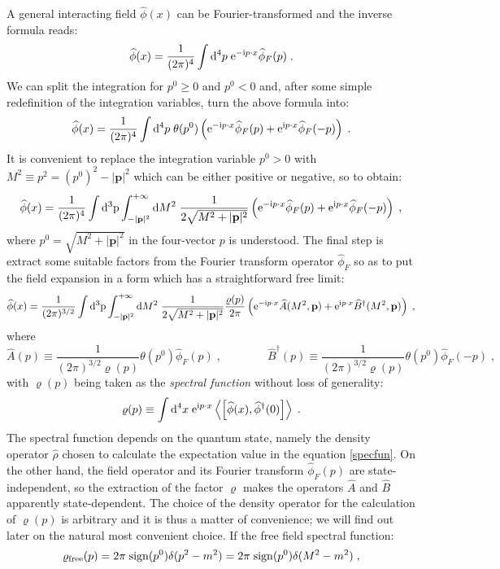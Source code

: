 \documentclass[prd,superscriptaddress,nofootinbib,notitlepage]{revtex4-1}
\def\wA{{\widehat A}}
\def\wrho{{\widehat{\rho}}}
\def\wA{\widehat A}
\def\wBd{\widehat B^{\dagger}}
\def\wphi{\widehat \phi}
\newcommand{\e}{{\rm e}}
\newcommand{\pp}{{\rm p}}
\newcommand{\di}{{\rm d}}
\newcommand{\ii}{{\rm i}}
\newcommand{\p}{{\mathbf{p}}}
\newcommand{\be}{\begin{equation}}
\newcommand{\ee}{\end{equation}}
\begin{document}
A general interacting field $\wphi(x)$ can be Fourier-transformed and the inverse formula reads:
%
$$
 \wphi(x) = \frac{1}{(2\pi)^4}\int \di^4 p \; \e^{-\ii p \cdot x} \wphi_F(p)\;.
$$
%
We can split the integration for $p^0 \ge 0$ and $p^0 < 0$ and, after some simple redefinition of the integration
variables, turn the above formula into:
%
$$
 \wphi(x) = \frac{1}{(2\pi)^4}\int \di^4 p \; \theta(p^0) \left( \e^{-\ii p \cdot x} \wphi_F(p)
  + \e^{\ii p \cdot x} \wphi_F(-p) \right)\;.
$$
%
It is convenient to replace the integration variable $p^0>0$ with $M^2\equiv p^2=(p^0)^2-|\p|^2$ which can be either 
positive or negative, so to obtain:
%
$$
 \wphi(x) = \frac{1}{(2\pi)^4}\int \di^3 \pp \int^{+\infty}_{-|\p|^2} \di M^2 \; \frac{1}{2\sqrt{M^2+|\p|^2}} 
 \left( \e^{-\ii p \cdot x} \wphi_F(p) + \e^{\ii p \cdot x} \wphi_F(-p) \right)\;,
$$
%
where $p^0 = \sqrt{M^2+|\p|^2}$ in the four-vector $p$ is understood. 
The final step is extract some suitable factors from the Fourier transform operator $\wphi_F$ so as
to put the field expansion in a form which has a straightforward free limit:
%
\be\label{intfield}
 \wphi(x) = \frac{1}{(2\pi)^{3/2}}\int \di^3 \pp \int^{+\infty}_{-|\p|^2} \di M^2 \; \frac{1}{2\sqrt{M^2+|\p|^2}} 
 \frac{\varrho(p)}{2\pi} \left( \e^{-\ii p \cdot x} \wA(M^2,\p) + \e^{\ii p \cdot x} \wBd(M^2,\p) \right)\;,
\ee
%
where 
%
\be\label{invfourier}
 \wA(p) \equiv \frac{1}{(2\pi)^{3/2}\varrho(p)} \theta(p^0) \wphi_F(p)\;, \qquad\qquad \wBd(p) \equiv \frac{1}{(2\pi)^{3/2}\varrho(p)} \theta(p^0) \wphi_F(-p)\;, 
\ee
%
with $\varrho(p)$ being taken as the {\em spectral function} without loss of generality:
%
\be\label{specfun}
 \varrho (p) \equiv \int \di^4 x \; \e^{\ii p \cdot x} \left\langle \left[\wphi(x),\wphi^\dagger(0)\right]\right\rangle\;.
\ee
%
The spectral function depends on the quantum state, namely the density operator $\wrho$ chosen to calculate the expectation
value in the equation \eqref{specfun}. On the other hand, the field operator and its Fourier transform $\wphi_F(p)$ are 
state-independent, so the extraction of the factor $\varrho$ makes the operators $\widehat{A}$ and $\widehat{B}$ apparently 
state-dependent. The choice of the density operator for the calculation of $\varrho(p)$ is arbitrary and it is thus a matter
of convenience; we will find out later on the natural most convenient choice.  If the free field spectral function:
%
\begin{equation}\label{freespectral}
    \varrho_{\rm free}(p) = 2\pi \; {\rm sign}(p^0) \delta(p^2-m^2) = 2\pi \; {\rm sign}(p^0) \delta(M^2-m^2)\;,
\end{equation}
\end{document}
